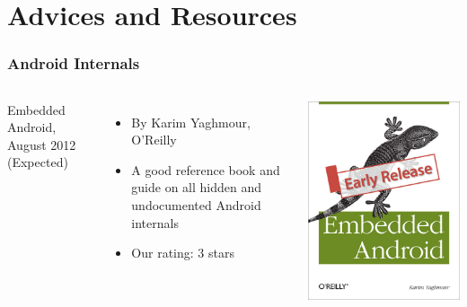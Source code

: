 \section{Advices and Resources}

\begin{frame}
  \frametitle{Android Internals}
  \begin{columns}
    Embedded Android, August 2012 (Expected)
    \begin{itemize}
    \item By Karim Yaghmour, O'Reilly
    \item A good reference book and guide on all hidden and
      undocumented Android internals
    \item Our rating: 3 stars
    \end{itemize}
    \includegraphics[width=\textwidth]{slides/android-resources/embedded-android.jpg}
  \end{columns}
\end{frame}

